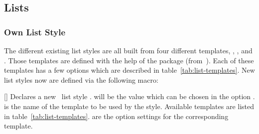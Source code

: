 \documentclass{acro-manual}
\begin{document}
\subsection{Lists}\label{sec:lists}
\subsubsection{Own List Style}

The different existing list styles are all built from four different
templates, , ,  and .
Those templates are defined with the help of the 
package (from~\cite{bnd:l3packages}).  Each of these templates has a few
options which are described in table~\vref{tab:list-templates}.  New list
styles now are defined via the following macro:

\begin{commands}
  []
    Declares a new \acro\ list style .   will be the
    value which can be chosen in the option .
     is the name of the template to be used by the style.
    Available templates are listed in table~\ref{tab:list-templates}.
     are the option settings for the corresponding template.
\end{commands}
\end{document}
